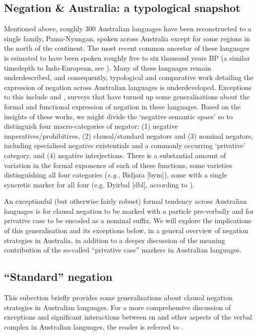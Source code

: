 \subsection{Negation \& Australia: a typological snapshot}

Mentioned above, roughly 300 Australian languages have been reconstructed to a single family, Pama-Nyungan, spoken across Australia except for some regions in the north of the continent. The most recent common ancestor of these languages is esimated to have been spoken roughly five to six thousand years \textsc{BP} (a similar timedepth to Indo-European, see \citealt[742]{Bouckaert2018}). Many of these languages remain underdescribed, and consequently, typological and comparative work detailing the expression of negation across Australian languages is underdeveloped. Exceptions to this include \citealp{Dixon2002a} and \citealt{Phillips2021b}, surveys that have turned up some generalisations about the formal and functional expression of negation in these languages. Based on the insights of these works, we might divide the `negative semantic space' so to distinguish four macro-categories of negator: (1) negative imperatives/prohibitives, (2) clausal/standard negators and (3) nominal negators, including specialised negative existentials and a commonly occurring `privative' category, and (4) negative interjections. There is a substantial amount of variation in the formal exponence of each of these functions, some varieties distinguishing all four categories  (\textit{e.g.}, Bidjara [\gls{bym}]), some with a single syncretic marker for all four (e.g. Dyirbal [\gls{dbl}], according to \citealp[84--table 3.3]{Dixon2002a}). 

An exceptionful (but otherwise fairly robust) formal tendency across Australian languages is for clausal negation to be marked with a particle pre-verbally and for privative case to be encoded as a nominal suffix. We will explore the implications of this generalisation and its exceptions below, in a general overview of negation strategies in Australia, in addition to a deeper discussion of the meaning contribution of the so-called ``privative case'' markers in Australian languages. %
\subsection{``Standard'' negation}
This subection briefly provides some generalisations about clausal negation strategies in Australian languages. For a more comprehensive discussion of exceptions and significant interactions between \acrshort{sn} and other aspects of the verbal complex in Australian languages, the reader is referred to \citealt{Phillips2021b}.

